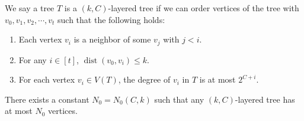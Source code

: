 \documentclass[10pt,a4paper]{amsart}
\newcommand{\dist}{\operatorname{dist}}
\begin{document}
\begin{definition}\label{def: tree}
    We say a tree $T$ is a $(k,C)$-layered tree if we can order vertices of the tree with $v_0,v_1,v_2,\cdots,v_t$ such that the following holds:
    \begin{enumerate}[label=(\arabic*)]
    \item Each vertex $v_i$ is a neighbor of some $v_j$ with $j<i$.
    \item For any $i\in [t]$, $\dist(v_0,v_i) \le k$.
    \item For each vertex $v_i\in  V(T)$, the degree of $v_i$ in $T$ is at most $2^{C+i}$.
    \end{enumerate}
\end{definition}

\begin{lemma}\label{lem: key}
    There exists a constant $N_0=N_0(C,k)$ such that any $(k,C)$-layered tree has at most $N_0$ vertices.
\end{lemma}
\end{document}
